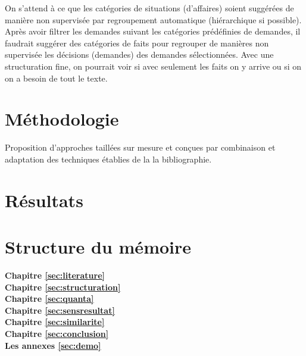 On s'attend à ce que les catégories de situations (d'affaires) soient suggérées de manière non supervisée par regroupement automatique (hiérarchique si possible). Après avoir filtrer les demandes suivant les catégories prédéfinies de demandes, il faudrait suggérer des catégories de faits pour regrouper de manières non supervisée les décisions (demandes) des demandes sélectionnées. Avec une structuration fine, on pourrait voir si avec seulement les faits on y arrive ou si on on a besoin de tout le texte.


\section{Méthodologie}
\label{sec:intro:methodologie}
Proposition d'approches taillées sur mesure et conçues par combinaison et adaptation des techniques établies de la la bibliographie.

\section{Résultats}
\label{sec:intro:résultats}


\section{Structure du mémoire}
\label{sec:intro:organisation}

\textbf{Chapitre \ref{sec:literature}} \\[0.2em]

\textbf{Chapitre \ref{sec:structuration}} \\[0.2em]

\textbf{Chapitre \ref{sec:quanta}} \\[0.2em]

\textbf{Chapitre \ref{sec:sensresultat}} \\[0.2em]

\textbf{Chapitre \ref{sec:similarite}} \\[0.2em]

\textbf{Chapitre \ref{sec:conclusion}} \\[0.2em]

\textbf{Les annexes \ref{sec:demo}} \\[0.2em]
